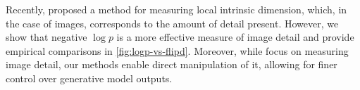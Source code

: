Recently, \citet{kamkari2024geometric} proposed a method for measuring local intrinsic dimension, which, in the case of images, corresponds to the amount of detail present. However, we show that negative $\log p$ is a more effective measure of image detail and provide empirical comparisons in \autoref{fig:logp-vs-flipd}. Moreover, while \citet{kamkari2024geometric} focus on measuring image detail, our methods enable direct manipulation of it, allowing for finer control over generative model outputs.